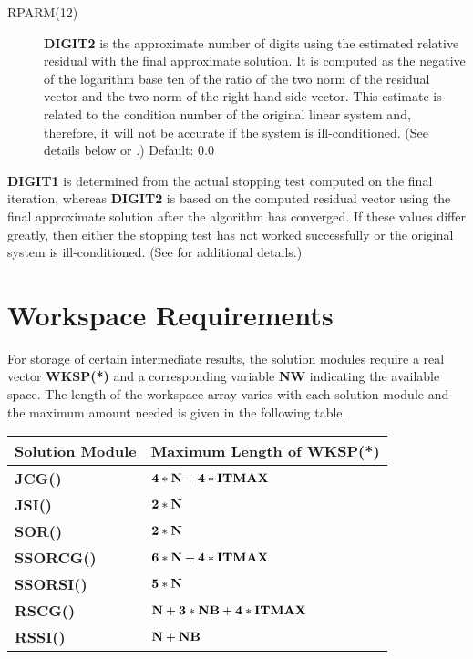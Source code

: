 \begin{description}
 \item[RPARM(12)] {\bf DIGIT2} is the approximate number of digits using 
                  the estimated relative residual with the final approximate
                  solution.  It is computed as the negative of the logarithm
                  base ten of the ratio of the two norm of the residual
                  vector and the two norm of the right-hand side vector.
                  This estimate is related to the condition number of the
                  original linear system and, therefore, it will not be
                  accurate if the system is ill-conditioned.  (See details
                  below or \cite{2}.)  Default: $0.0$
\end{description}
\bigskip 
 
{\bf DIGIT1} is determined from the actual stopping test computed on 
the final iteration, whereas {\bf DIGIT2} is based on the computed 
residual vector using the final approximate solution after the algorithm 
has converged.  If these values differ greatly, then either the stopping 
test has not worked successfully or the original system is ill-conditioned.
(See \cite{2} for additional details.)

\section{Workspace Requirements}
\label{wksp}
 
For storage of certain intermediate results, the solution modules
require a real vector {\bf WKSP(*)} and a corresponding variable {\bf NW}
indicating the available space.  The length of the workspace array varies 
with each solution module and the maximum amount needed is given in 
the following table.
 
\bigskip
\begin{tabular}{ll} \hline
  Solution Module & Maximum Length of {\bf WKSP(*)} \\ \hline
  {\bf JCG()}    & ${\bf 4*N + 4*ITMAX}$ \\
  {\bf JSI()}    & ${\bf 2*N}$ \\
  {\bf SOR()}    & ${\bf 2*N}$ \\
  {\bf SSORCG()} & ${\bf 6*N + 4*ITMAX}$ \\
  {\bf SSORSI()} & ${\bf 5*N}$ \\
  {\bf RSCG()}   & ${\bf N + 3*NB + 4*ITMAX}$ \\
  {\bf RSSI()}   & ${\bf N + NB}$ \\ \hline
\end{tabular}
\bigskip
 
